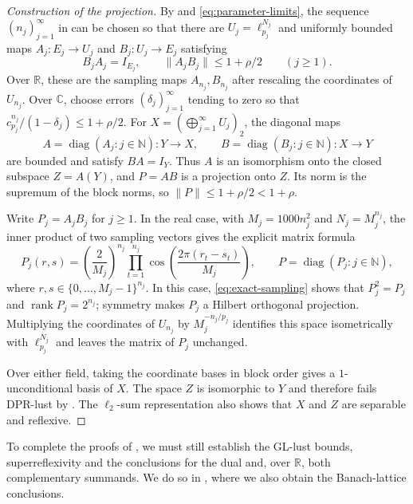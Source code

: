 \documentclass[11pt,a4paper,reqno]{amsart}
\theoremstyle{definition}
\newcommand{\N}{\mathbb N}
\newcommand{\R}{\mathbb R}
\newcommand{\C}{\mathbb C}
\newcommand{\norm}[1]{\lVert #1\rVert}
\DeclareMathOperator{\rank}{rank}
\DeclareMathOperator{\diag}{diag}
\numberwithin{equation}{section}
\begin{document}
\begin{proof}[Construction of the projection]
By  and \eqref{eq:parameter-limits}, the sequence $(n_j)_{j=1}^{\infty}$ in  can be chosen so that there are $U_j=\ell_{p_j}^{N_j}$ and uniformly bounded maps $A_j\colon E_j\to U_j$ and $B_j\colon U_j\to E_j$ satisfying
\begin{equation*}
 B_jA_j=I_{E_j},\qquad \norm{A_jB_j}\leq1+\rho/2
 \qquad(j\geq1).
\end{equation*}
Over $\R$, these are the sampling maps $A_{n_j},B_{n_j}$ after rescaling the coordinates of $U_{n_j}$. Over $\C$, choose errors $(\delta_j)_{j=1}^{\infty}$ tending to zero so that $c_{p_j}^{n_j}/(1-\delta_j)\leq1+\rho/2$. For $X=(\bigoplus_{j=1}^{\infty}U_j)_2$, the diagonal maps
\begin{equation*}
 A=\diag(A_j:j\in\N)\colon Y\to X,
 \qquad B=\diag(B_j:j\in\N)\colon X\to Y
\end{equation*}
are bounded and satisfy $BA=I_Y$. Thus $A$ is an isomorphism onto the closed subspace $Z=A(Y)$, and $P=AB$ is a projection onto $Z$. Its norm is the supremum of the block norms, so $\norm P\leq1+\rho/2<1+\rho$.

Write $P_j=A_jB_j$ for $j\geq1$. In the real case, with $M_j=1000n_j^2$ and $N_j=M_j^{n_j}$, the inner product of two sampling vectors gives the explicit matrix formula
\begin{equation}\label{eq:explicit-projection}
 P_j(r,s)=\left(\frac2{M_j}\right)^{n_j}
 \prod_{t=1}^{n_j}\cos\left(\frac{2\pi(r_t-s_t)}{M_j}\right),
 \qquad P=\diag(P_j:j\in\N),
\end{equation}
where $r,s\in\{0,\ldots,M_j-1\}^{n_j}$. In this case, \eqref{eq:exact-sampling} shows that $P_j^2=P_j$ and $\rank P_j=2^{n_j}$; symmetry makes $P_j$ a Hilbert orthogonal projection. Multiplying the coordinates of $U_{n_j}$ by $M_j^{-n_j/p_j}$ identifies this space isometrically with $\ell_{p_j}^{N_j}$ and leaves the matrix of $P_j$ unchanged.

Over either field, taking the coordinate bases in block order gives a $1$-unconditional basis of $X$. The space $Z$ is isomorphic to $Y$ and therefore fails DPR-lust by . The $\ell_2$-sum representation also shows that $X$ and $Z$ are separable and reflexive.
\end{proof}

To complete the proofs of , we must still establish the GL-lust bounds, superreflexivity and the conclusions for the dual and, over $\R$, both complementary summands. We do so in , where we also obtain the Banach-lattice conclusions.
\end{document}
